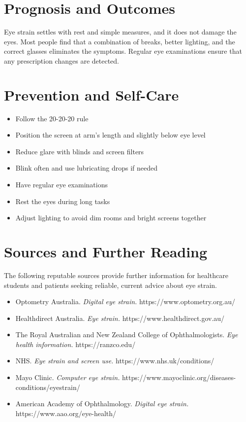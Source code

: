 \section*{Prognosis and Outcomes}
Eye strain settles with rest and simple measures, and it does not damage the eyes. Most people find that a combination of breaks, better lighting, and the correct glasses eliminates the symptoms. Regular eye examinations ensure that any prescription changes are detected.

\section*{Prevention and Self-Care}
\begin{itemize}
    \item Follow the 20-20-20 rule
    \item Position the screen at arm's length and slightly below eye level
    \item Reduce glare with blinds and screen filters
    \item Blink often and use lubricating drops if needed
    \item Have regular eye examinations
    \item Rest the eyes during long tasks
    \item Adjust lighting to avoid dim rooms and bright screens together
\end{itemize}

\section*{Sources and Further Reading}
The following reputable sources provide further information for healthcare students and patients seeking reliable, current advice about eye strain.
\begin{itemize}
    \item Optometry Australia. \textit{Digital eye strain.} https://www.optometry.org.au/
    \item Healthdirect Australia. \textit{Eye strain.} https://www.healthdirect.gov.au/
    \item The Royal Australian and New Zealand College of Ophthalmologists. \textit{Eye health information.} https://ranzco.edu/
    \item NHS. \textit{Eye strain and screen use.} https://www.nhs.uk/conditions/
    \item Mayo Clinic. \textit{Computer eye strain.} https://www.mayoclinic.org/diseases-conditions/eyestrain/
    \item American Academy of Ophthalmology. \textit{Digital eye strain.} https://www.aao.org/eye-health/
\end{itemize}
